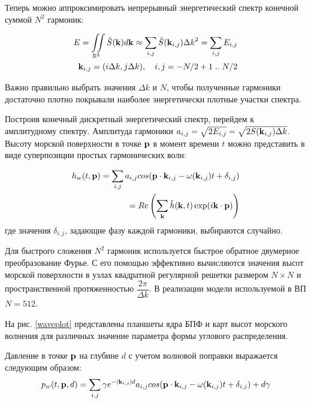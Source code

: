 Теперь можно аппроксимировать непрерывный энергетический спектр конечной суммой $N^2$ гармоник:

\begin{equation}
\label{longe-higgins}
\begin{split}
E = \iint\limits_{\mathbb{R}^2} \hat{S}(\mathbf{k})d\mathbf{k}
    \approx \sum_{i,j} \hat{S}(\mathbf{k}_{i,j}) {\Delta k}^2 
    = \sum_{i,j} E_{i,j}\\
\mathbf{k}_{i,j} = (i\Delta k, j\Delta k), \quad i,j = -N/2+1 \; .. \; N/2 
\end{split}
\end{equation}

Важно правильно выбрать значения $\Delta k$ и $N$, чтобы полученные гармоники достаточно плотно покрывали наиболее энергетически плотные участки спектра.

Построив конечный дискретный энергетический спектр, перейдем к амплитудному спектру. Амплитуда гармоники $a_{i,j} = \sqrt{2E_{i,j}} = \sqrt{2S(\mathbf{k}_{i,j})\Delta k}$. Высоту морской поверхности в точке $\mathbf{p}$ в момент времени $t$ можно представить в виде суперпозиции простых гармонических волн:

\begin{equation}
\label{wave_height}
\begin{split}
h_w(t,\mathbf{p}) = \sum_{i,j} a_{i,j}cos(\mathbf{p}\cdot \mathbf{k}_{i,j} - \omega(\mathbf{k}_{i,j})t + \delta_{i,j}) \\
= Re\left( \sum_{\mathbf{k}} \tilde{h}(\mathbf{k}, t)
 \exp(i\mathbf{k} \cdot \mathbf{p}) \right)
\end{split}
\end{equation}
где значения $\delta_{i,j}$, задающие фазу каждой гармоники, выбираются случайно.

Для быстрого сложения $N^2$ гармоник используется быстрое обратное двумерное преобразование Фурье. С его помощью эффективно вычисляются значения высот морской поверхности в узлах квадратной регулярной решетки размером $N \times N$ и пространственной протяженностью $\dfrac{2\pi}{\Delta k}$. 
В реализации модели используемой в ВП $N = 512$.

На рис. \ref{waveplot} представлены планшеты ядра БПФ и карт высот морского волнения для различных значение параметра формы углового распределения.

Давление в точке $\mathbf{p}$ на глубине $d$ с учетом волновой поправки выражается следующим образом:
\begin{equation}
\label{wave_height}
	p_w(t,\mathbf{p},d) = \sum_{i,j}
		\gamma e^{-\lvert\mathbf{k}_{i,j}\rvert d} 
		a_{i,j}cos(\mathbf{p}\cdot \mathbf{k}_{i,j} 
		- \omega(\mathbf{k}_{i,j})t 
		+ \delta_{i,j}) + d \gamma
\end{equation}

